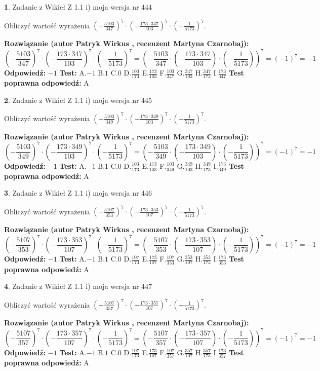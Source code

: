 \documentclass[12pt, a4paper]{article}
\theoremstyle{definition} %
\newtheorem{zad}{}
\newcommand{\zadStart}[1]{\begin{zad}#1\newline}
\newcommand{\zadStop}{\end{zad}}
\newcommand{\rozwStart}[2]{\noindent \textbf{Rozwiązanie (autor #1 , recenzent #2): }\newline}
\newcommand{\rozwStop}{\newline}
\newcommand{\odpStart}{\noindent \textbf{Odpowiedź:}\newline}
\newcommand{\odpStop}{\newline}
\newcommand{\testStart}{\noindent \textbf{Test:}\newline}
\newcommand{\testStop}{\newline}
\newcommand{\kluczStart}{\noindent \textbf{Test poprawna odpowiedź:}\newline}
\newcommand{\kluczStop}{\newline}
\begin{document}
\zadStart{Zadanie z Wikieł Z 1.1 i) moja wersja nr 444}

Obliczyć wartość wyrażenia $(-\frac{5103}{347})^{7} \cdot (-\frac{173 \cdot 347}{103})^{7} \cdot (-\frac{1}{5173})^{7}$.
\zadStop
\rozwStart{Patryk Wirkus}{Martyna Czarnobaj}
$$(-\frac{5103}{347})^{7} \cdot (-\frac{173 \cdot 347}{103})^{7} \cdot (-\frac{1}{5173})^{7} = (-\frac{5103}{347} \cdot (-\frac{173 \cdot 347}{103}) \cdot (-\frac{1}{5173}))^{7} = (-1)^{7} = -1$$
\rozwStop
\odpStart
$-1$
\odpStop
\testStart
A.$-1$ B.$1$ C.$0$ D.$\frac{103}{173}$ E.$\frac{173}{103}$
F.$\frac{103}{347}$ G.$\frac{347}{103}$
H.$\frac{347}{173}$
I.$\frac{173}{347}$
\testStop
\kluczStart
A
\kluczStop



\zadStart{Zadanie z Wikieł Z 1.1 i) moja wersja nr 445}

Obliczyć wartość wyrażenia $(-\frac{5103}{349})^{7} \cdot (-\frac{173 \cdot 349}{103})^{7} \cdot (-\frac{1}{5173})^{7}$.
\zadStop
\rozwStart{Patryk Wirkus}{Martyna Czarnobaj}
$$(-\frac{5103}{349})^{7} \cdot (-\frac{173 \cdot 349}{103})^{7} \cdot (-\frac{1}{5173})^{7} = (-\frac{5103}{349} \cdot (-\frac{173 \cdot 349}{103}) \cdot (-\frac{1}{5173}))^{7} = (-1)^{7} = -1$$
\rozwStop
\odpStart
$-1$
\odpStop
\testStart
A.$-1$ B.$1$ C.$0$ D.$\frac{103}{173}$ E.$\frac{173}{103}$
F.$\frac{103}{349}$ G.$\frac{349}{103}$
H.$\frac{349}{173}$
I.$\frac{173}{349}$
\testStop
\kluczStart
A
\kluczStop



\zadStart{Zadanie z Wikieł Z 1.1 i) moja wersja nr 446}

Obliczyć wartość wyrażenia $(-\frac{5107}{353})^{7} \cdot (-\frac{173 \cdot 353}{107})^{7} \cdot (-\frac{1}{5173})^{7}$.
\zadStop
\rozwStart{Patryk Wirkus}{Martyna Czarnobaj}
$$(-\frac{5107}{353})^{7} \cdot (-\frac{173 \cdot 353}{107})^{7} \cdot (-\frac{1}{5173})^{7} = (-\frac{5107}{353} \cdot (-\frac{173 \cdot 353}{107}) \cdot (-\frac{1}{5173}))^{7} = (-1)^{7} = -1$$
\rozwStop
\odpStart
$-1$
\odpStop
\testStart
A.$-1$ B.$1$ C.$0$ D.$\frac{107}{173}$ E.$\frac{173}{107}$
F.$\frac{107}{353}$ G.$\frac{353}{107}$
H.$\frac{353}{173}$
I.$\frac{173}{353}$
\testStop
\kluczStart
A
\kluczStop



\zadStart{Zadanie z Wikieł Z 1.1 i) moja wersja nr 447}

Obliczyć wartość wyrażenia $(-\frac{5107}{357})^{7} \cdot (-\frac{173 \cdot 357}{107})^{7} \cdot (-\frac{1}{5173})^{7}$.
\zadStop
\rozwStart{Patryk Wirkus}{Martyna Czarnobaj}
$$(-\frac{5107}{357})^{7} \cdot (-\frac{173 \cdot 357}{107})^{7} \cdot (-\frac{1}{5173})^{7} = (-\frac{5107}{357} \cdot (-\frac{173 \cdot 357}{107}) \cdot (-\frac{1}{5173}))^{7} = (-1)^{7} = -1$$
\rozwStop
\odpStart
$-1$
\odpStop
\testStart
A.$-1$ B.$1$ C.$0$ D.$\frac{107}{173}$ E.$\frac{173}{107}$
F.$\frac{107}{357}$ G.$\frac{357}{107}$
H.$\frac{357}{173}$
I.$\frac{173}{357}$
\testStop
\kluczStart
A
\kluczStop
\end{document}
